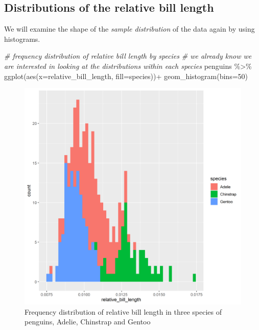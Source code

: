 \documentclass[
]{book}
\newenvironment{Shaded}{\begin{snugshade}}{\end{snugshade}}
\newcommand{\AttributeTok}[1]{\textcolor[rgb]{0.77,0.63,0.00}{#1}}
\newcommand{\CommentTok}[1]{\textcolor[rgb]{0.56,0.35,0.01}{\textit{#1}}}
\newcommand{\DecValTok}[1]{\textcolor[rgb]{0.00,0.00,0.81}{#1}}
\newcommand{\FunctionTok}[1]{\textcolor[rgb]{0.00,0.00,0.00}{#1}}
\newcommand{\NormalTok}[1]{#1}
\newcommand{\SpecialCharTok}[1]{\textcolor[rgb]{0.00,0.00,0.00}{#1}}
\begin{document}
\hypertarget{distributions-of-the-relative-bill-length}{%
\subsection{Distributions of the relative bill length}\label{distributions-of-the-relative-bill-length}}

We will examine the shape of the \emph{sample distribution} of the data again by using histograms.

\begin{Shaded}
\begin{Highlighting}[]
\CommentTok{\# frequency distribution of relative bill length by species}
\CommentTok{\# we already know we are interested in looking at the distributions \textquotesingle{}within\textquotesingle{} each species}
\NormalTok{penguins }\SpecialCharTok{\%\textgreater{}\%} 
  \FunctionTok{ggplot}\NormalTok{(}\FunctionTok{aes}\NormalTok{(}\AttributeTok{x=}\NormalTok{relative\_bill\_length, }\AttributeTok{fill=}\NormalTok{species))}\SpecialCharTok{+}
  \FunctionTok{geom\_histogram}\NormalTok{(}\AttributeTok{bins=}\DecValTok{50}\NormalTok{)}
\end{Highlighting}
\end{Shaded}

\begin{figure}
\includegraphics[width=0.8\linewidth]{images/bill_length_distribution} \caption{Frequency distribution of relative bill length in three species of penguins, Adelie, Chinstrap and Gentoo}\label{fig:unnamed-chunk-97}
\end{figure}
\end{document}
